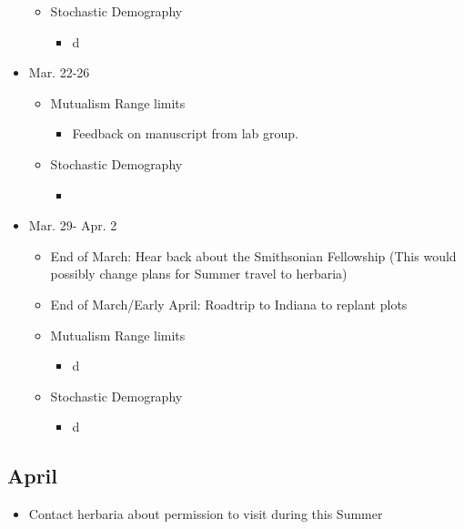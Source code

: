 \documentclass{article}
\begin{document}
\begin{itemize}
\begin{itemize}
     \item{Stochastic Demography}
        \begin{itemize}
           \item{d}
        \end{itemize} 
    \end{itemize}     
 
        
\item{Mar. 22-26}
   \begin{itemize}
     \item{Mutualism Range limits}
        \begin{itemize}
            \item{Feedback on manuscript from lab group.}
        \end{itemize}
   
     \item{Stochastic Demography}
        \begin{itemize}
           \item{}
        \end{itemize}     
    \end{itemize}     

\item{Mar. 29- Apr. 2}
   \begin{itemize}
     \item{End of March: Hear back about the Smithsonian Fellowship (This would possibly change plans for Summer travel to herbaria)}
     \item{End of March/Early April: Roadtrip to Indiana to replant plots}

     \item{Mutualism Range limits}
        \begin{itemize}
            \item{d}
        \end{itemize}
   
     \item{Stochastic Demography}
        \begin{itemize}
           \item{d}
        \end{itemize} 
      \end{itemize}     
\end{itemize}

\subsection*{April}
\begin{itemize}
\item{Contact herbaria about permission to visit during this Summer}
\end{itemize}
\end{document}
